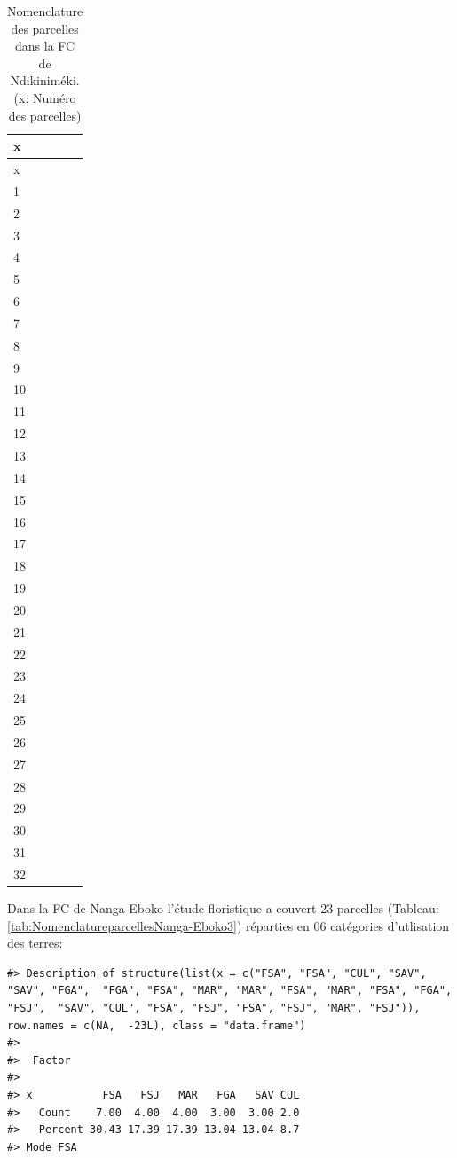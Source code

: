 \documentclass[
  12pt,
  a4paper,
  extrafontsizes,
  onecolumn,
  openright]{book}
\theoremstyle{definition}
\theoremstyle{definition}
\theoremstyle{definition}
\theoremstyle{definition}
\theoremstyle{remark}
\begin{document}
\begin{longtable}[]{@{}l@{}}
\caption{\label{tab:Nomenclatureparcelles-Ndikinimeki3}Nomenclature des parcelles dans la FC de Ndikiniméki. (x: Numéro des parcelles)}\tabularnewline
\toprule()
x \\
\midrule()
\endfirsthead
\toprule()
x \\
\midrule()
\endhead
1 \\
2 \\
3 \\
4 \\
5 \\
6 \\
7 \\
8 \\
9 \\
10 \\
11 \\
12 \\
13 \\
14 \\
15 \\
16 \\
17 \\
18 \\
19 \\
20 \\
21 \\
22 \\
23 \\
24 \\
25 \\
26 \\
27 \\
28 \\
29 \\
30 \\
31 \\
32 \\
\bottomrule()
\end{longtable}

Dans la FC de Nanga-Eboko l'étude floristique a couvert 23 parcelles (Tableau:\ref{tab:NomenclatureparcellesNanga-Eboko3}) réparties en 06 catégories d'utlisation des terres:

\begin{verbatim}
#> Description of structure(list(x = c("FSA", "FSA", "CUL", "SAV", "SAV", "FGA",  "FGA", "FSA", "MAR", "MAR", "FSA", "MAR", "FSA", "FGA", "FSJ",  "SAV", "CUL", "FSA", "FSJ", "FSA", "FSJ", "MAR", "FSJ")), row.names = c(NA,  -23L), class = "data.frame")
#> 
#>  Factor 
#>          
#> x           FSA   FSJ   MAR   FGA   SAV CUL
#>   Count    7.00  4.00  4.00  3.00  3.00 2.0
#>   Percent 30.43 17.39 17.39 13.04 13.04 8.7
#> Mode FSA
\end{verbatim}
\end{document}
